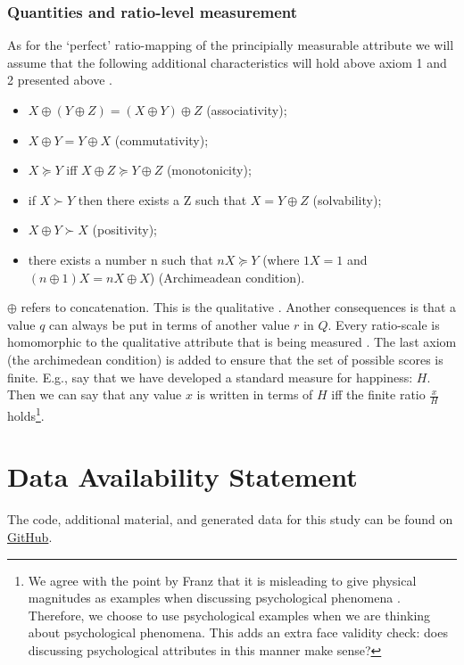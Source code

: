 \documentclass[utf8]{FrontiersinVancouver}
\begin{document}
\subsubsection{Quantities and ratio-level measurement}
As for the `perfect' ratio-mapping of the principially measurable attribute we will assume that the following additional characteristics will hold above axiom 1 and 2 presented above \citep{krantzFoundationsMeasurement1971}. 

\begin{itemize}
    \item $X \oplus (Y \oplus Z) = (X \oplus Y) \oplus Z$ (associativity);
    \item $X \oplus Y = Y \oplus X$ (commutativity);
    \item $X \succeq Y$ iff $X \oplus Z \succeq Y \oplus Z$ (monotonicity);
    \item if $X \succ Y$ then there exists a Z such that $X = Y \oplus Z$ (solvability);
    \item $X \oplus Y \succ X$ (positivity);
    \item there exists a number n such that $nX \succeq Y$ (where $1X = 1$ and $(n \oplus 1) X = nX \oplus X$) (Archimeadean condition).
\end{itemize}

$\oplus$ refers to concatenation. This is the qualitative . Another consequences is that a value $q$ can always be put in terms of another value $r$ in $Q$. Every ratio-scale is homomorphic to the qualitative attribute that is being measured \citep{michellAxiomsQuantityTheory1997}. The last axiom (the archimedean condition) is added to ensure that the set of possible scores is finite. E.g., say that we have developed a standard measure for happiness: $H$. Then we can say that any value $x$ is written in terms of $H$ iff the finite ratio $\frac{x}{H}$ holds\footnote{We agree with the point by Franz that it is misleading to give physical magnitudes as examples when discussing psychological phenomena \citep{franzArePsychologicalAttributes2022}. Therefore, we choose to use psychological examples when we are thinking about psychological phenomena. This adds an extra face validity check: does discussing psychological attributes in this manner make sense?}.


\section*{Data Availability Statement}
The code, additional material, and generated data for this study can be found on \href{https://github.com/MvanSteenbergen/MasterThesisRQA}{GitHub}.
\end{document}
